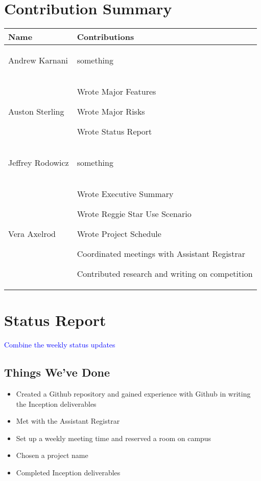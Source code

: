 \documentclass[11pt]{article}
\newenvironment{packed_itemize}{
\begin{itemize}
  \setlength{\itemsep}{1pt}
  \setlength{\parskip}{0pt}
  \setlength{\parsep}{0pt}
}{\end{itemize}}
\begin{document}
\section{Contribution Summary} %
\begin{tabular}{|m{1.4in}|m{4in}|}
\hline
\textbf{\large Name}     & \textbf{\large Contributions} \\
\hline\hline
 Andrew Karnani
	&
	 \begin{packed_itemize}
		\item something
	\end{packed_itemize}
\\
\hline
 Auston Sterling
	&
	 \begin{packed_itemize}
	        \item Wrote Major Features
                \item Wrote Major Risks
                \item Wrote Status Report
	\end{packed_itemize}
\\
\hline
Jeffrey Rodowicz
	&
	 \begin{packed_itemize}
		\item something
	\end{packed_itemize}
\\
\hline
Vera Axelrod
	&
	 \begin{packed_itemize}
		\item Wrote Executive Summary
		\item Wrote Reggie Star Use Scenario
		\item Wrote Project Schedule
		\item Coordinated meetings with Assistant Registrar
		\item Contributed research  and writing on competition
	\end{packed_itemize}
\\
\hline
\end{tabular}


\section{Status Report} %
\textcolor{blue}{Combine the weekly status updates}
\subsection{Things We've Done}
\begin{itemize}
\item Created a Github repository and gained experience with Github in writing the Inception deliverables
\item Met with the Assistant Registrar
\item Set up a weekly meeting time and reserved a room on campus
\item Chosen a project name
\item Completed Inception deliverables
\end{itemize}
\end{document}
